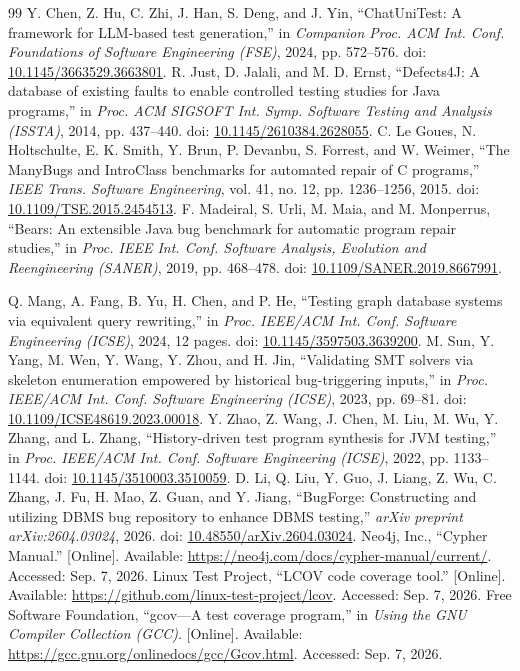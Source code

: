 \documentclass[acmsmall,screen,anonymous]{acmart}
\begin{document}
\begin{thebibliography}{99}
 Y. Chen, Z. Hu, C. Zhi, J. Han, S. Deng, and J. Yin, ``ChatUniTest: A framework for LLM-based test generation,'' in \emph{Companion Proc. ACM Int. Conf. Foundations of Software Engineering (FSE)}, 2024, pp. 572--576. doi: \href{https://doi.org/10.1145/3663529.3663801}{10.1145/3663529.3663801}.
 R. Just, D. Jalali, and M. D. Ernst, ``Defects4J: A database of existing faults to enable controlled testing studies for Java programs,'' in \emph{Proc. ACM SIGSOFT Int. Symp. Software Testing and Analysis (ISSTA)}, 2014, pp. 437--440. doi: \href{https://doi.org/10.1145/2610384.2628055}{10.1145/2610384.2628055}.
 C. Le Goues, N. Holtschulte, E. K. Smith, Y. Brun, P. Devanbu, S. Forrest, and W. Weimer, ``The ManyBugs and IntroClass benchmarks for automated repair of C programs,'' \emph{IEEE Trans. Software Engineering}, vol. 41, no. 12, pp. 1236--1256, 2015. doi: \href{https://doi.org/10.1109/TSE.2015.2454513}{10.1109/TSE.2015.2454513}.
 F. Madeiral, S. Urli, M. Maia, and M. Monperrus, ``Bears: An extensible Java bug benchmark for automatic program repair studies,'' in \emph{Proc. IEEE Int. Conf. Software Analysis, Evolution and Reengineering (SANER)}, 2019, pp. 468--478. doi: \href{https://doi.org/10.1109/SANER.2019.8667991}{10.1109/SANER.2019.8667991}.
\par
{} Q. Mang, A. Fang, B. Yu, H. Chen, and P. He, ``Testing graph database systems via equivalent query rewriting,'' in \emph{Proc. IEEE/ACM Int. Conf. Software Engineering (ICSE)}, 2024, 12 pages. doi: \href{https://doi.org/10.1145/3597503.3639200}{10.1145/3597503.3639200}.
 M. Sun, Y. Yang, M. Wen, Y. Wang, Y. Zhou, and H. Jin, ``Validating SMT solvers via skeleton enumeration empowered by historical bug-triggering inputs,'' in \emph{Proc. IEEE/ACM Int. Conf. Software Engineering (ICSE)}, 2023, pp. 69--81. doi: \href{https://doi.org/10.1109/ICSE48619.2023.00018}{10.1109/ICSE48619.2023.00018}.
 Y. Zhao, Z. Wang, J. Chen, M. Liu, M. Wu, Y. Zhang, and L. Zhang, ``History-driven test program synthesis for JVM testing,'' in \emph{Proc. IEEE/ACM Int. Conf. Software Engineering (ICSE)}, 2022, pp. 1133--1144. doi: \href{https://doi.org/10.1145/3510003.3510059}{10.1145/3510003.3510059}.
 D. Li, Q. Liu, Y. Guo, J. Liang, Z. Wu, C. Zhang, J. Fu, H. Mao, Z. Guan, and Y. Jiang, ``BugForge: Constructing and utilizing DBMS bug repository to enhance DBMS testing,'' \emph{arXiv preprint arXiv:2604.03024}, 2026. doi: \href{https://doi.org/10.48550/arXiv.2604.03024}{10.48550/arXiv.2604.03024}.
 Neo4j, Inc., ``Cypher Manual.'' [Online]. Available: \url{https://neo4j.com/docs/cypher-manual/current/}. Accessed: Sep. 7, 2026.
 Linux Test Project, ``LCOV code coverage tool.'' [Online]. Available: \url{https://github.com/linux-test-project/lcov}. Accessed: Sep. 7, 2026.
 Free Software Foundation, ``gcov---A test coverage program,'' in \emph{Using the GNU Compiler Collection (GCC)}. [Online]. Available: \url{https://gcc.gnu.org/onlinedocs/gcc/Gcov.html}. Accessed: Sep. 7, 2026.
\end{thebibliography}





\makeatletter
\let\baselinestretch\ACM@origbaselinestretch
\makeatother
\end{document}
